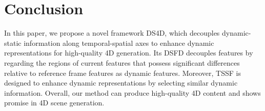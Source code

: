 \section{Conclusion}
In this paper, we propose a novel framework DS4D, which decouples dynamic-static information along temporal-spatial axes to enhance dynamic representations for high-quality 4D generation. Its DSFD decouples features by regarding the regions of current features that possess significant differences relative to reference frame features as dynamic features. Moreover, TSSF is designed to enhance dynamic representations by selecting similar dynamic information. Overall, our method can produce high-quality 4D content and shows promise in 4D scene generation.
